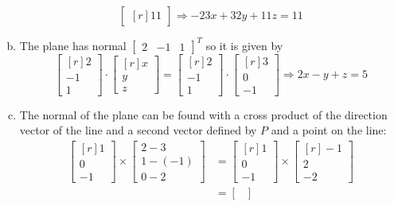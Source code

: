 \documentclass[../main.tex]{subfiles}
\begin{document}
\begin{enumerate}[a)]
\[\begin{bmatrix*}[r]
				11
			\end{bmatrix*}
			\Rightarrow
			-23x + 32y + 11z = 11
		\]
	\setcounter{enumi}{3}
	\item The plane has normal $\begin{bmatrix}2&-1&1\end{bmatrix}^T$ so it is given by
		\[
			\begin{bmatrix*}[r]
				2 \\
				-1 \\
				1
			\end{bmatrix*}
			\cdot
			\begin{bmatrix*}[r]
				x \\
				y \\
				z
			\end{bmatrix*}
			=
			\begin{bmatrix*}[r]
				2 \\
				-1 \\
				1
			\end{bmatrix*}
			\cdot
			\begin{bmatrix*}[r]
				3 \\
				0 \\
				-1
			\end{bmatrix*}
			\Rightarrow
			2x - y + z = 5
		\]
	\setcounter{enumi}{5}
	\item The normal of the plane can be found with a cross product of the direction vector of the line and a second vector defined by $P$ and a point on the line:
		\begin{align*}
			\begin{bmatrix*}[r]
				1 \\
				0 \\
				-1
			\end{bmatrix*}
			\times
			\begin{bmatrix}
				2 - 3 \\
				1 - (-1) \\
				0 - 2
			\end{bmatrix}
			&=
			\begin{bmatrix*}[r]
				1 \\
				0 \\
				-1
			\end{bmatrix*}
			\times
			\begin{bmatrix*}[r]
				-1 \\
				2 \\
				-2
			\end{bmatrix*}
			\\&=
			\begin{bmatrix}

\end{bmatrix}
\end{align*}
\end{enumerate}
\end{document}
